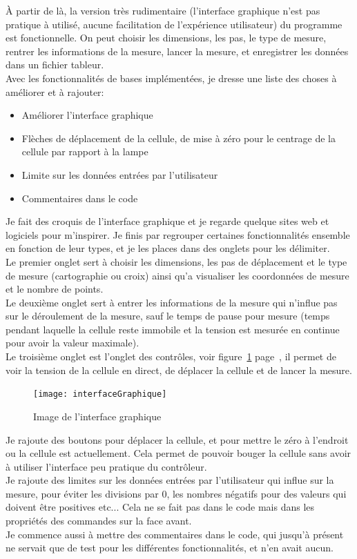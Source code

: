 \documentclass[12pt]{article}
\begin{document}
À partir de là, la version très rudimentaire (l'interface graphique n'est pas pratique à utilisé, aucune facilitation de l'expérience utilisateur) du programme est fonctionnelle.
On peut choisir les dimensions, les pas, le type de mesure, rentrer les informations de la mesure, lancer la mesure, et enregistrer les données dans un fichier tableur.\\
Avec les fonctionnalités de bases implémentées, je dresse une liste des choses à améliorer et à rajouter:
\begin{itemize}
	\item Améliorer l'interface graphique
	\item Flèches de déplacement de la cellule, de mise à zéro pour le centrage de la cellule par rapport à la lampe
	\item Limite sur les données entrées par l'utilisateur
	\item Commentaires dans le code
\end{itemize}
Je fait des croquis de l'interface graphique et je regarde quelque sites web et logiciels pour m'inspirer.
Je finis par regrouper certaines fonctionnalités ensemble en fonction de leur types, et je les places dans des onglets pour les délimiter.\\
Le premier onglet sert à choisir les dimensions, les pas de déplacement et le type de mesure (cartographie ou croix) ainsi qu'a visualiser les coordonnées de mesure et le nombre de points.\\
Le deuxième onglet sert à entrer les informations de la mesure qui n'influe pas sur le déroulement de la mesure, sauf le temps de pause pour mesure (temps pendant laquelle la cellule reste immobile et la tension est mesurée en continue pour avoir la valeur maximale).\\
Le troisième onglet est l'onglet des contrôles, voir figure~\ref{fig:interfaceGraphique} page~\pageref{fig:interfaceGraphique}, il permet de voir la tension de la cellule en direct, de déplacer la cellule et de lancer la mesure.
\begin{figure}[h]
	\centering
	\texttt{[image: interfaceGraphique]}
	\caption{Image de l'interface graphique}
	\label{fig:interfaceGraphique}
\end{figure}
Je rajoute des boutons pour déplacer la cellule, et pour mettre le zéro à l'endroit ou la cellule est actuellement.
Cela permet de pouvoir bouger la cellule sans avoir à utiliser l'interface peu pratique du contrôleur.\\
Je rajoute des limites sur les données entrées par l'utilisateur qui influe sur la mesure, pour éviter les divisions par 0, les nombres négatifs pour des valeurs qui doivent être positives etc... Cela ne se fait pas dans le code mais dans les propriétés des commandes sur la face avant.\\
Je commence aussi à mettre des commentaires dans le code, qui jusqu'à présent ne servait que de test pour les différentes fonctionnalités, et n'en avait aucun.
\end{document}
